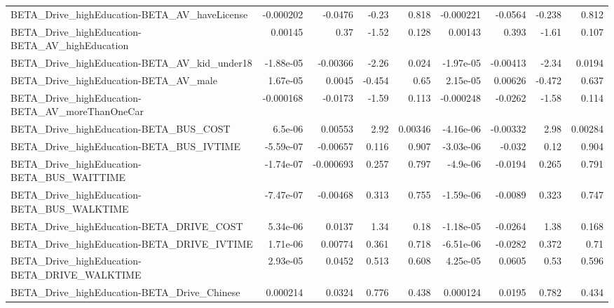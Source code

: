 \begin{tabular}{lrrrrrrrr}
BETA\_Drive\_highEducation-BETA\_AV\_haveLicense       &   -0.000202 &      -0.0476 &    -0.23 &    0.818 &  -0.000221 &     -0.0564 &       -0.238 &         0.812 \\
BETA\_Drive\_highEducation-BETA\_AV\_highEducation     &     0.00145 &         0.37 &    -1.52 &    0.128 &    0.00143 &       0.393 &        -1.61 &         0.107 \\
BETA\_Drive\_highEducation-BETA\_AV\_kid\_under18       &   -1.88e-05 &     -0.00366 &    -2.26 &    0.024 &  -1.97e-05 &    -0.00413 &        -2.34 &        0.0194 \\
BETA\_Drive\_highEducation-BETA\_AV\_male              &    1.67e-05 &       0.0045 &   -0.454 &     0.65 &   2.15e-05 &     0.00626 &       -0.472 &         0.637 \\
BETA\_Drive\_highEducation-BETA\_AV\_moreThanOneCar    &   -0.000168 &      -0.0173 &    -1.59 &    0.113 &  -0.000248 &     -0.0262 &        -1.58 &         0.114 \\
BETA\_Drive\_highEducation-BETA\_BUS\_COST             &     6.5e-06 &      0.00553 &     2.92 &  0.00346 &  -4.16e-06 &    -0.00332 &         2.98 &       0.00284 \\
BETA\_Drive\_highEducation-BETA\_BUS\_IVTIME           &   -5.59e-07 &     -0.00657 &    0.116 &    0.907 &  -3.03e-06 &      -0.032 &         0.12 &         0.904 \\
BETA\_Drive\_highEducation-BETA\_BUS\_WAITTIME         &   -1.74e-07 &    -0.000693 &    0.257 &    0.797 &   -4.9e-06 &     -0.0194 &        0.265 &         0.791 \\
BETA\_Drive\_highEducation-BETA\_BUS\_WALKTIME         &   -7.47e-07 &     -0.00468 &    0.313 &    0.755 &  -1.59e-06 &     -0.0089 &        0.323 &         0.747 \\
BETA\_Drive\_highEducation-BETA\_DRIVE\_COST           &    5.34e-06 &       0.0137 &     1.34 &     0.18 &  -1.18e-05 &     -0.0264 &         1.38 &         0.168 \\
BETA\_Drive\_highEducation-BETA\_DRIVE\_IVTIME         &    1.71e-06 &      0.00774 &    0.361 &    0.718 &  -6.51e-06 &     -0.0282 &        0.372 &          0.71 \\
BETA\_Drive\_highEducation-BETA\_DRIVE\_WALKTIME       &    2.93e-05 &       0.0452 &    0.513 &    0.608 &   4.25e-05 &      0.0605 &         0.53 &         0.596 \\
BETA\_Drive\_highEducation-BETA\_Drive\_Chinese        &    0.000214 &       0.0324 &    0.776 &    0.438 &   0.000124 &      0.0195 &        0.782 &         0.434 \\

\end{tabular}

